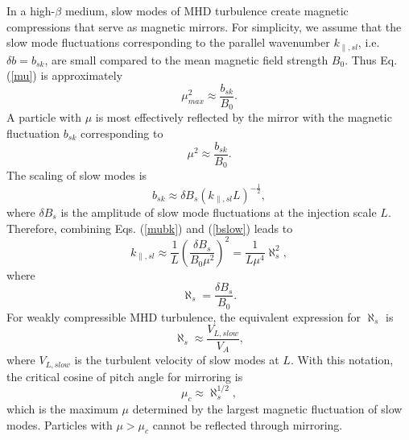 \documentclass[preprint2,twocolumn,times,tighten]{aastex63}
\newcommand*{\xu}{\color{magenta}}
\begin{document}
In a high-$\beta$ medium, 
slow modes of MHD turbulence create magnetic compressions that {serve as magnetic mirrors}. 
For simplicity, we assume that the slow mode fluctuations corresponding to the parallel wavenumber $k_{\|,sl}$, i.e. $\delta b=b_{sk}$, are small compared to the mean magnetic field strength $B_0$. Thus Eq. (\ref{mu}) is approximately 
\begin{equation}
\mu_{max}^2\approx \frac{b_{sk}}{B_0}.
\end{equation}
A particle with $\mu$ is most effectively reflected by the mirror 
with the magnetic fluctuation $b_{sk}$
corresponding to \citep{CesK73}
\begin{equation}
\mu^2\approx \frac{b_{sk}}{B_0}.
\label{mubk}
\end{equation}
The scaling of slow modes is
\citep{CL03} 
\begin{equation}
\label{bslow}
   b_{sk} \approx  \delta B_s (k_{\|, sl} L)^{-\frac{1}{2}},
\end{equation}
where $\delta B_s$ is the amplitude of slow mode fluctuations at the injection scale $L$. Therefore, combining Eqs. (\ref{mubk}) and (\ref{bslow}) leads to
\begin{equation}
k_{\|, sl} \approx \frac{1}{L} \left(\frac{\delta B_s}{B_0 \mu^2}\right)^2 =\frac{1}{L\mu^4} \aleph_s^{2},
\label{bkslow}
\end{equation}
where 
\begin{equation}
    \aleph_s =  \frac{\delta B_s}{B_0}.
\end{equation}
For weakly compressible MHD turbulence, the equivalent expression for $\aleph_s$ is
\begin{equation}\label{equns}
    \aleph_s \approx \frac{V_{L,slow}}{V_A},
\end{equation}
where $V_{L,slow}$ is {the turbulent velocity of slow modes} at $L$. With this notation, the critical cosine of pitch angle for mirroring is 
\begin{equation}
    \mu_{c}\approx \aleph_s^{1/2},
    \label{mualeph}
\end{equation}
which is the maximum $\mu$ determined by the largest magnetic fluctuation of slow modes. 
Particles with $\mu>\mu_c$ cannot be reflected through mirroring. 
\end{document}
